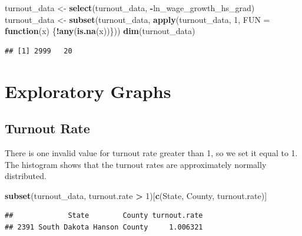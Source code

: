 \documentclass[
]{article}
\newenvironment{Shaded}{\begin{snugshade}}{\end{snugshade}}
\newcommand{\AttributeTok}[1]{\textcolor[rgb]{0.13,0.29,0.53}{#1}}
\newcommand{\ControlFlowTok}[1]{\textcolor[rgb]{0.13,0.29,0.53}{\textbf{#1}}}
\newcommand{\DecValTok}[1]{\textcolor[rgb]{0.00,0.00,0.81}{#1}}
\newcommand{\FunctionTok}[1]{\textcolor[rgb]{0.13,0.29,0.53}{\textbf{#1}}}
\newcommand{\NormalTok}[1]{#1}
\newcommand{\OtherTok}[1]{\textcolor[rgb]{0.56,0.35,0.01}{#1}}
\newcommand{\SpecialCharTok}[1]{\textcolor[rgb]{0.81,0.36,0.00}{\textbf{#1}}}
\newcommand{\StringTok}[1]{\textcolor[rgb]{0.31,0.60,0.02}{#1}}
\begin{document}
\begin{Shaded}
\begin{Highlighting}[]
\NormalTok{turnout\_data }\OtherTok{\textless{}{-}} \FunctionTok{select}\NormalTok{(turnout\_data, }\SpecialCharTok{{-}}\NormalTok{ln\_wage\_growth\_hs\_grad)}
\NormalTok{turnout\_data }\OtherTok{\textless{}{-}} \FunctionTok{subset}\NormalTok{(turnout\_data, }\FunctionTok{apply}\NormalTok{(turnout\_data, }\DecValTok{1}\NormalTok{, }\AttributeTok{FUN =} \ControlFlowTok{function}\NormalTok{(x) \{}\SpecialCharTok{!}\FunctionTok{any}\NormalTok{(}\FunctionTok{is.na}\NormalTok{(x))\}))}
\FunctionTok{dim}\NormalTok{(turnout\_data)}
\end{Highlighting}
\end{Shaded}

\begin{verbatim}
## [1] 2999   20
\end{verbatim}

\section{Exploratory Graphs}\label{exploratory-graphs}

\subsection{Turnout Rate}\label{turnout-rate}

There is one invalid value for turnout rate greater than 1, so we set it
equal to 1. The histogram shows that the turnout rates are approximately
normally distributed.

\begin{Shaded}
\begin{Highlighting}[]
\FunctionTok{subset}\NormalTok{(turnout\_data, turnout.rate }\SpecialCharTok{\textgreater{}} \DecValTok{1}\NormalTok{)[}\FunctionTok{c}\NormalTok{(}\StringTok{\textquotesingle{}State\textquotesingle{}}\NormalTok{, }\StringTok{\textquotesingle{}County\textquotesingle{}}\NormalTok{, }\StringTok{\textquotesingle{}turnout.rate\textquotesingle{}}\NormalTok{)]}
\end{Highlighting}
\end{Shaded}

\begin{verbatim}
##             State        County turnout.rate
## 2391 South Dakota Hanson County     1.006321
\end{verbatim}
\end{document}
